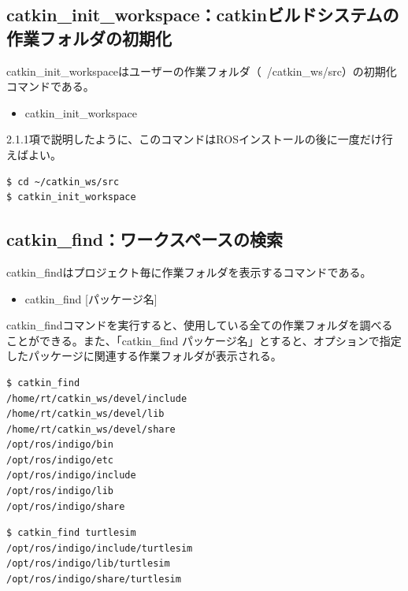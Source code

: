 \subsection{catkin\_init\_workspace：catkinビルドシステムの作業フォルダの初期化}

catkin\_init\_workspaceはユーザーの作業フォルダ（~/catkin\_ws/src）の初期化コマンドである。

\begin{itemize}
\item catkin\_init\_workspace
\end{itemize}

2.1.1項で説明したように、このコマンドはROSインストールの後に一度だけ行えばよい。

\begin{lstlisting}[language=ROS]
$ cd ~/catkin_ws/src
$ catkin_init_workspace
\end{lstlisting}

\subsection{catkin\_find：ワークスペースの検索}

catkin\_findはプロジェクト毎に作業フォルダを表示するコマンドである。

\begin{itemize}
\item  catkin\_find [パッケージ名]
\end{itemize}

catkin\_findコマンドを実行すると、使用している全ての作業フォルダを調べることができる。また、「catkin\_find パッケージ名」とすると、オプションで指定したパッケージに関連する作業フォルダが表示される。

\begin{lstlisting}[language=ROS]
$ catkin_find
/home/rt/catkin_ws/devel/include
/home/rt/catkin_ws/devel/lib
/home/rt/catkin_ws/devel/share
/opt/ros/indigo/bin
/opt/ros/indigo/etc
/opt/ros/indigo/include
/opt/ros/indigo/lib
/opt/ros/indigo/share
\end{lstlisting}

\begin{lstlisting}[language=ROS]
$ catkin_find turtlesim
/opt/ros/indigo/include/turtlesim
/opt/ros/indigo/lib/turtlesim
/opt/ros/indigo/share/turtlesim
\end{lstlisting}

